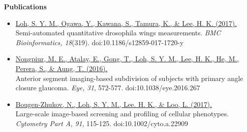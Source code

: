 \documentclass[letterpaper,11pt]{article}
\newcommand{\resheading}[1]{{\large \colorbox{mygrey}{\begin{minipage}{\textwidth}{\textbf{#1 \vphantom{p\^{E}}}}\end{minipage}}}}
\begin{document}
\resheading{Publications}

\begin{itemize}
  \item \small{\href{https://www.ncbi.nlm.nih.gov/pmc/articles/PMC5490177/pdf/12859_2017_Article_1720.pdf}{Loh, S. Y. M., Ogawa, Y., Kawana, S., Tamura, K., \& Lee, H. K. (2017).}} \\ \scriptsize{Semi-automated quantitative drosophila wings measurements. \textit{BMC Bioinformatics, 18}(319). doi:10.1186/s12859-017-1720-y }
  \item \small{\href{https://www.nature.com/eye/journal/v31/n4/full/eye2016267a.html}{Nongpiur, M. E., Atalay, E., Gong, T., Loh, S. Y. M., Lee, H. K., He, M., Perera, S., \& Aung, T. (2016).}} \\  \scriptsize{Anterior segment imaging-based subdivision of subjects with primary angle closure glaucoma. \textit{Eye, 31}, 572-577. doi:10.1038/eye.2016.267}
  \item \small{\href{http://onlinelibrary.wiley.com/doi/10.1002/cyto.a.22909/abstract}{Bougen-Zhukov, N., Loh, S. Y. M., Lee. H. K., \& Loo, L. (2017).}} \\ \scriptsize{Large-scale image-based screening and profiling of cellular phenotypes. \textit{Cytometry Part A, 91}, 115-125. doi:10.1002/cyto.a.22909}
\end{itemize}
\end{document}
